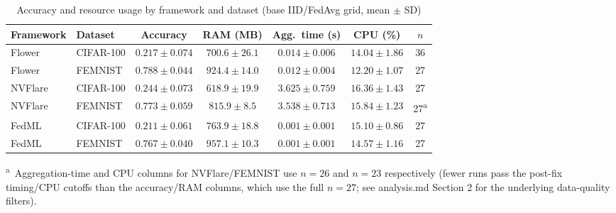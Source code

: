 \begin{table}[htbp]
\centering
\caption{Accuracy and resource usage by framework and dataset (base IID/FedAvg grid, mean $\pm$ SD)}
\label{tab:framework-comparison}
\begin{tabular}{llccccc}
\toprule
Framework & Dataset & Accuracy & RAM (MB) & Agg.\ time (s) & CPU (\%) & $n$ \\
\midrule
Flower  & CIFAR-100 & $0.217 \pm 0.074$ & $700.6 \pm 26.1$ & $0.014 \pm 0.006$ & $14.04 \pm 1.86$ & 36 \\
Flower  & FEMNIST   & $0.788 \pm 0.044$ & $924.4 \pm 14.0$ & $0.012 \pm 0.004$ & $12.20 \pm 1.07$ & 27 \\
\addlinespace
NVFlare & CIFAR-100 & $0.244 \pm 0.073$ & $618.9 \pm 19.9$ & $3.625 \pm 0.759$ & $16.36 \pm 1.43$ & 27 \\
NVFlare & FEMNIST   & $0.773 \pm 0.059$ & $815.9 \pm 8.5$  & $3.538 \pm 0.713$ & $15.84 \pm 1.23$ & 27\textsuperscript{a} \\
\addlinespace
FedML   & CIFAR-100 & $0.211 \pm 0.061$ & $763.9 \pm 18.8$ & $0.001 \pm 0.001$ & $15.10 \pm 0.86$ & 27 \\
FedML   & FEMNIST   & $0.767 \pm 0.040$ & $957.1 \pm 10.3$ & $0.001 \pm 0.001$ & $14.57 \pm 1.16$ & 27 \\
\bottomrule
\end{tabular}

\vspace{0.5em}
\footnotesize
\textsuperscript{a}~Aggregation-time and CPU columns for NVFlare/FEMNIST use $n=26$ and $n=23$
respectively (fewer runs pass the post-fix timing/CPU cutoffs than the accuracy/RAM columns,
which use the full $n=27$; see analysis.md Section 2 for the underlying data-quality filters).
\end{table}
